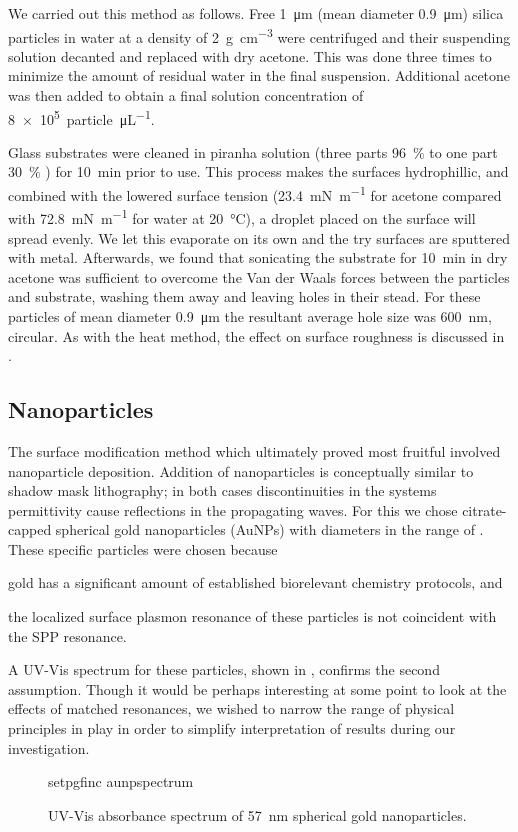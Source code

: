 We carried out this method as follows.  Free \SI{1}{\micro\meter} (mean
diameter \SI{0.9}{\micro\meter}) silica particles in water at a density of
\SI{2}{\gram\per\centi\meter\cubed} were centrifuged and their suspending
solution decanted and replaced with dry acetone.  This was done three times
to minimize the amount of residual water in the final suspension.
Additional acetone was then added to obtain a final solution concentration
of \SI{8e5}{particle\per\micro\liter}.  

Glass substrates were cleaned in piranha solution (three parts
\SI{96}{\percent}  to one part \SI{30}{\percent} ) for
\SI{10}{\minute} prior to use.  This process makes the surfaces
hydrophillic, and combined with the lowered surface tension
(\SI{23.4}{\milli\newton\per\meter} for acetone compared with
\SI{72.8}{\milli\newton\per\meter} for water at \SI{20}{\celsius}), a
droplet placed on the surface will spread evenly.  We let this evaporate on
its own and the try surfaces are sputtered with metal.  Afterwards, we
found that sonicating the substrate for \SI{10}{\minute} in dry acetone was
sufficient to overcome the Van der Waals forces between the particles and
substrate, washing them away and leaving holes in their stead.  For these
particles of mean diameter \SI{0.9}{\micro\meter} the resultant average
hole size was \SI{600}{\nano\meter}, circular.  As with the heat method,
the effect on surface roughness is discussed in
.

\subsection{Nanoparticles}
The surface modification method which ultimately proved most fruitful
involved nanoparticle deposition.  Addition of nanoparticles is
conceptually similar to shadow mask lithography; in both cases
discontinuities in the systems permittivity cause reflections in the
propagating waves.  For this we chose citrate-capped spherical gold
nanoparticles (AuNPs) with diameters in the range of
.  
These specific particles were chosen because
\begin{inparaenum}[(a)]
\item gold has a significant amount of established biorelevant chemistry
				protocols, and
\item the localized surface plasmon resonance of these particles is not
				coincident with the SPP resonance.
\end{inparaenum}
A UV-Vis spectrum for these particles, shown in ,
confirms the second assumption.  Though it would be perhaps interesting at
some point to look at the effects of matched resonances, we wished to
narrow the range of physical principles in play in order to simplify
interpretation of results during our investigation.
\begin{figure}[ht]
 \centering
 {setpgfinc}
 {aunpspectrum}
 \caption{UV-Vis absorbance spectrum of \SI{57}{\nano\meter} spherical gold
 nanoparticles.}
 \label{fig:aunpspectrum}
\end{figure}

